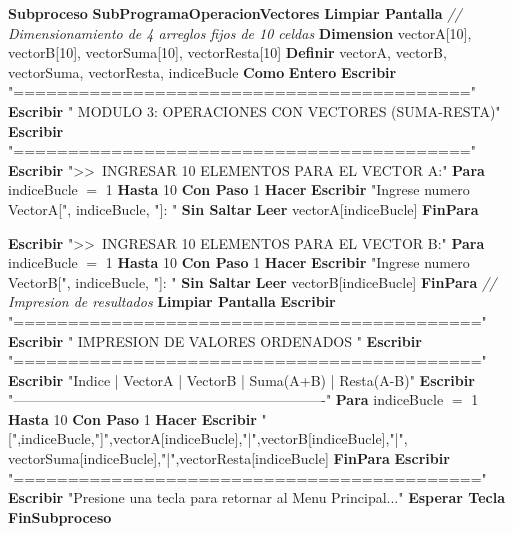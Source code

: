 \documentclass[12pt,a4paper]{article}
\newcommand{\kw}[1]{\textcolor{pseKeyword}{\textbf{#1}}}
\newcommand{\txt}[1]{\textcolor{pseString}{"#1"}}
\newcommand{\num}[1]{\textcolor{pseNumber}{#1}}
\newcommand{\cmt}[1]{\textcolor{pseComment}{\textit{// #1}}}
\newcommand{\opAsig}{\textcolor{pseKeyword}{$=$}}
\newcommand{\Escribir}[1]{\kw{Escribir} #1}
\newcommand{\EscribirSS}[1]{\kw{Escribir} #1 \kw{Sin Saltar}}
\newcommand{\Leer}[1]{\kw{Leer} #1}
\newcommand{\Definir}[2]{\kw{Definir} #1 \kw{Como} \kw{#2}}
\newcommand{\Para}[4]{\kw{Para} #1 \opAsig{} \num{#2} \kw{Hasta} \num{#3} \kw{Con Paso} \num{#4} \kw{Hacer}}
\newcommand{\FinPara}{\kw{FinPara}}
\newcommand{\Subproceso}[1]{\kw{Subproceso} \textbf{#1}}
\newcommand{\FinSubproceso}{\kw{FinSubproceso}}
\newcommand{\Dimension}[1]{\kw{Dimension} #1}
\newcommand{\I}{\hspace{1.5em}}
\newcommand{\II}{\hspace{3.0em}}
\begin{document}
\begin{algorithmic}[1]
		\State \Subproceso{SubProgramaOperacionVectores}
		\State \I \kw{Limpiar Pantalla}
		\State \I \cmt{Dimensionamiento de 4 arreglos fijos de 10 celdas}
		\State \I \Dimension{vectorA[\num{10}], vectorB[\num{10}], vectorSuma[\num{10}], vectorResta[\num{10}]}
		\State \I \Definir{vectorA, vectorB, vectorSuma, vectorResta, indiceBucle}{Entero}
		\State
		\State \I \Escribir{\txt{==========================================}}
		\State \I \Escribir{\txt{ MODULO 3: OPERACIONES CON VECTORES (SUMA-RESTA)}}
		\State \I \Escribir{\txt{==========================================}}
		\State
		\State
		\State \I \Escribir{\txt{\textgreater\textgreater\ INGRESAR 10 ELEMENTOS PARA EL VECTOR A:}}
		\State \I \Para{indiceBucle}{1}{10}{1}
		\State \II \EscribirSS{\txt{Ingrese numero VectorA[}, indiceBucle, \txt{]: }}
		\State \II \Leer{vectorA[indiceBucle]}
		\State \I \FinPara
		
		\State
		\State \I \Escribir{\txt{\textgreater\textgreater\ INGRESAR 10 ELEMENTOS PARA EL VECTOR B:}}
		\State \I \Para{indiceBucle}{1}{10}{1}
		\State \II \EscribirSS{\txt{Ingrese numero VectorB[}, indiceBucle, \txt{]: }}
		\State \II \Leer{vectorB[indiceBucle]}
		\State \I \FinPara
		\State \I \cmt{Impresion de resultados}
		\State \I \kw{Limpiar Pantalla}
		\State \I \Escribir{\txt{===========================================}}
		\State \I \Escribir{\txt{        IMPRESION DE VALORES ORDENADOS }}
		\State \I \Escribir{\txt{===========================================}}
		\State \I \Escribir{\txt{Indice | VectorA | VectorB | Suma(A+B) | Resta(A-B)}}
		\State \I \Escribir{\txt{-------------------------------------------------------------------}}
		\State \I \Para{indiceBucle}{1}{10}{1}
		\State \II \Escribir{\txt{[},indiceBucle,\txt{]},vectorA[indiceBucle],\txt{|},vectorB[indiceBucle],\txt{|},
			vectorSuma[indiceBucle],\txt{|},vectorResta[indiceBucle]}
		\State \I \FinPara
		\State \I \Escribir{\txt{===========================================}}
		\State \I \Escribir{\txt{Presione una tecla para retornar al Menu Principal...}}
		\State \I \kw{Esperar Tecla}
		\State \FinSubproceso
		

\end{algorithmic}
\end{document}

